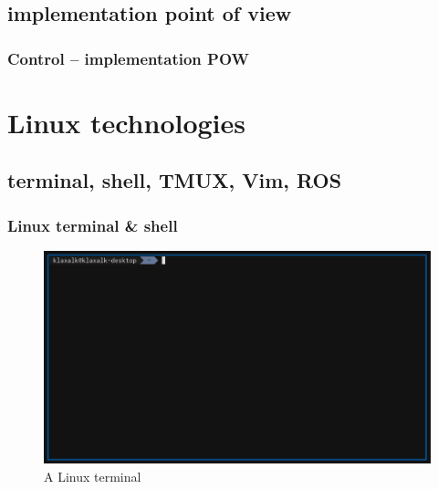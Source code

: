 \documentclass{beamer}
\begin{document}
\subsection{implementation point of view}

\begin{frame}
  \frametitle{Control -- implementation POW}

  \centering
  \begin{figure}
    \begin{adjustbox}{max totalsize={1.0\textwidth}{.85\textheight}, center}
      
    \end{adjustbox}
  \end{figure}

\end{frame}


\section{Linux technologies}
\subsection{terminal, shell, TMUX, Vim, ROS}

\begin{frame}
  \frametitle{Linux terminal \& shell}

  \begin{figure}
    \caption{A Linux terminal}
    \includegraphics[width=1.0\textwidth]{./fig/terminal.png}
  \end{figure}

\end{frame}
\end{document}
